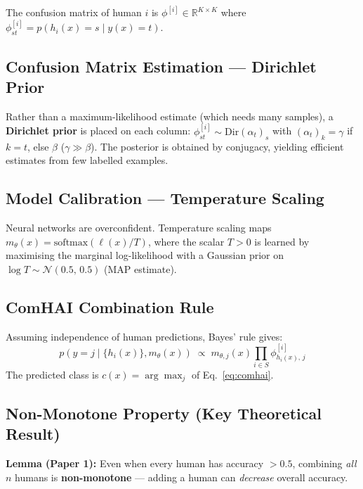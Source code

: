 \documentclass[10pt,twocolumn]{article}
\begin{document}
The confusion matrix of human $i$ is $\phi^{[i]}\in\mathbb{R}^{K\times K}$
where $\phi^{[i]}_{st}=p(h_i(x){=}s\mid y(x){=}t)$.

\subsection{Confusion Matrix Estimation --- Dirichlet Prior}

Rather than a maximum-likelihood estimate (which needs many samples),
a \textbf{Dirichlet prior} is placed on each column:
$\phi^{[i]}_{st}\sim\mathrm{Dir}(\alpha_t)_s$ with
$(\alpha_t)_k = \gamma$ if $k=t$, else $\beta$ ($\gamma\gg\beta$).
The posterior is obtained by conjugacy, yielding efficient estimates
from few labelled examples.

\subsection{Model Calibration --- Temperature Scaling}

Neural networks are overconfident. Temperature scaling maps
$m_\theta(x) = \mathrm{softmax}(\ell(x)/T)$, where the scalar
$T>0$ is learned by maximising the marginal log-likelihood with a
Gaussian prior on $\log T\sim\mathcal{N}(0.5,\,0.5)$ (MAP estimate).

\subsection{ComHAI Combination Rule}

Assuming independence of human predictions, Bayes' rule gives:
\begin{equation}
  p\!\left(y{=}j\mid \{h_i(x)\},m_\theta(x)\right)
  \;\propto\;
  m_{\theta,j}(x)\prod_{i\in S}\phi^{[i]}_{h_i(x),\,j}
  \label{eq:comhai}
\end{equation}
The predicted class is $c(x)=\arg\max_j$ of Eq.~\eqref{eq:comhai}.

\subsection{Non-Monotone Property (Key Theoretical Result)}

\begin{tcolorbox}[warnbox]
\textbf{Lemma (Paper 1):} Even when every human has accuracy $>0.5$,
combining \emph{all} $n$ humans is \textbf{non-monotone} --- adding a
human can \emph{decrease} overall accuracy.
\end{tcolorbox}
\end{document}
